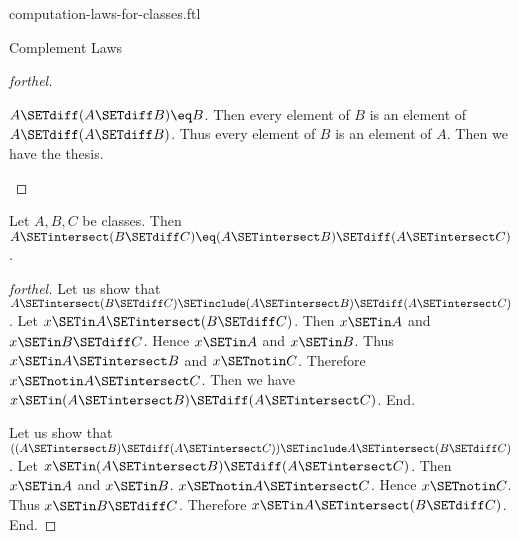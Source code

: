 \documentclass{stex}
\begin{document}
\begin{smodule}{computation-laws-for-classes.ftl}
\begin{sfragment}{Complement Laws}
\begin{proof}[forthel]
    \begin{case}{$A \SETdiff (A \SETdiff B) \eq B$.}
      Then every element of $B$ is an element of $A \SETdiff (A \SETdiff B)$.
      Thus every element of $B$ is an element of $A$.
      Then we have the thesis.
    \end{case}
  \end{proof}

  \begin{proposition}[forthel,id=FOUNDATIONS_02_5811954316738560]
    Let $A, B, C$ be classes.
    Then $A \SETintersect (B \SETdiff C) \eq (A \SETintersect B) \SETdiff (A \SETintersect C)$.
  \end{proposition}
  \begin{proof}[forthel]
    Let us show that $A \SETintersect (B \SETdiff C) \SETinclude (A \SETintersect B) \SETdiff (A \SETintersect C)$.
      Let $x \SETin A \SETintersect (B \SETdiff C)$.
      Then $x \SETin A$ and $x \SETin B \SETdiff C$.
      Hence $x \SETin A$ and $x \SETin B$.
      Thus $x \SETin A \SETintersect B$ and $x \SETnotin C$.
      Therefore $x \SETnotin A \SETintersect C$.
      Then we have $x \SETin (A \SETintersect B) \SETdiff (A \SETintersect C)$.
    End.

    Let us show that $((A \SETintersect B) \SETdiff (A \SETintersect C)) \SETinclude A \SETintersect (B \SETdiff C)$. %
      Let $x \SETin (A \SETintersect B) \SETdiff (A \SETintersect C)$.
      Then $x \SETin A$ and $x \SETin B$.
      $x \SETnotin A \SETintersect C$.
      Hence $x \SETnotin C$.
      Thus $x \SETin B \SETdiff C$.
      Therefore $x \SETin A \SETintersect (B \SETdiff C)$.
    End.
  \end{proof}
\end{sfragment}
\end{smodule}
\end{document}
